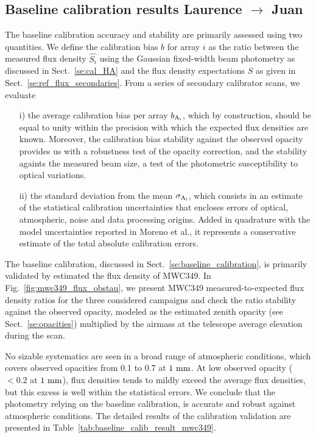 %
%
%
\subsection{Baseline calibration results {\color{blue} Laurence $\rightarrow$ Juan}}

The baseline calibration accuracy and stability are primarily assessed
using two quantities. We define the calibration bias $b$ for array $i$ as
the ratio between the measured flux density $\hat{S_{i}}$ using the
Gaussian fixed-width beam photometry as discussed in
Sect.~\ref{se:cal_HA} and the flux density expectations $\hat{S}$ as
given in Sect.~\ref{se:ref_flux_secondaries}. From a series of
secondary calibrator scans, we evaluate
\begin{itemize}
\item[i)] the average calibration bias per array $b_{\rm A_i}$,
  which by construction, should be equal to unity within the precision
  with which the expected flux densities are known. Moreover, 
  the calibration bias stability against the observed opacity provides
  us with a robustness test of the opacity correction, and the stability
  againts the measured beam size, a test of the photometric
  susceptibility to optical variations. %
\item[ii)] the standard deviation from the mean $\sigma_{\rm A_i}$,
  which consists in an estimate of the statistical calibration
  uncertainties that encloses errors of optical, atmospheric, noise
  and data processing origins. Added in quadrature with the model
  uncertainties reported in Moreno et al., it represents a
  conservative estimate of the total absolute calibration errors.
\end{itemize}


The baseline calibration, discussed in Sect.~\ref{se:baseline_calibration}, is primarily
validated by estimated the flux density of MWC349. In
Fig.~\ref{fig:mwc349_flux_obstau}, we present MWC349
measured-to-expected flux density ratios for the three considered
campaigns and check the ratio stability against the observed opacity,
modeled as the estimated zenith opacity (see Sect.~\ref{se:opacities}) multiplied
by the airmass at the telescope average elevation during the scan. 


No sizable systematics are seen in a broad range
of atmospheric conditions, which covers observed opacities from 0.1 to
0.7 at $1~\rm{mm}$. At low observed
opacity ($<0.2$ at $1~\rm{mm}$), flux densities tends to mildly exceed
the average flux densities, but this excess is well within the statistical
errors. We conclude that the photometry relying on the baseline
calibration, is accurate and robust against atmospheric
conditions. The detailed results of the calibration validation are
presented in Table~\ref{tab:baseline_calib_result_mwc349}.


